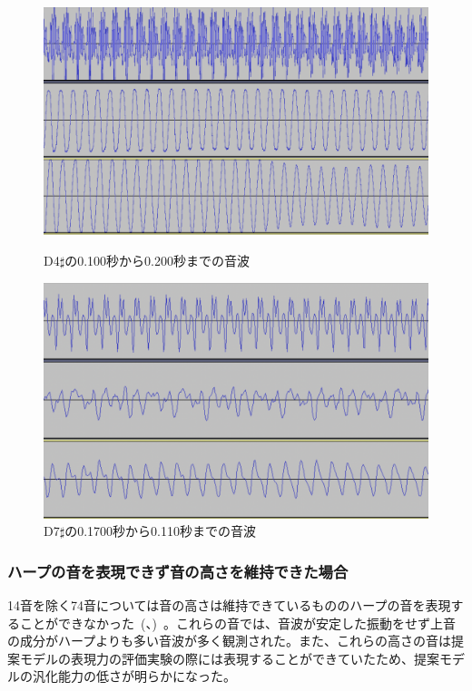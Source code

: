 \begin{figure}[b]
\centering
\begin{minipage}{0.48\columnwidth}
\centering
\includegraphics[width=0.85\columnwidth]{figure/66_22_det/d4s_0100_0200.png}
\caption[D4$\sharp$の音波]{D4$\sharp$の0.100秒から0.200秒までの音波}
\label{fig:66_22_near}
\end{minipage}
\begin{minipage}{0.48\columnwidth}
\centering
\includegraphics[width=0.85\columnwidth]{figure/66_22_det/d7s_0100_0110.png}
\caption[D7$\sharp$の音波]{D7$\sharp$の0.1700秒から0.110秒までの音波}
\label{fig:66_22_bad4}
\end{minipage}
\end{figure}

\clearpage

\subsubsection{ハープの音を表現できず音の高さを維持できた場合}

14音を除く74音については音の高さは維持できているもののハープの音を表現することができなかった~(、)~。これらの音では、音波が安定した振動をせず上音の成分がハープよりも多い音波が多く観測された。また、これらの高さの音は提案モデルの表現力の評価実験の際には表現することができていたため、提案モデルの汎化能力の低さが明らかになった。

